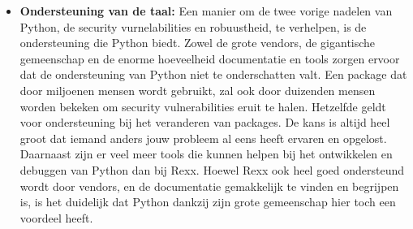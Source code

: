 \begin{itemize}
    \item \textbf{Ondersteuning van de taal:} Een manier om de twee vorige nadelen van Python, de security vurnelabilities en robuustheid, te verhelpen, is de ondersteuning die Python biedt. Zowel de grote vendors, de gigantische gemeenschap en de enorme hoeveelheid documentatie en tools zorgen ervoor dat de ondersteuning van Python niet te onderschatten valt. Een package dat door miljoenen mensen wordt gebruikt, zal ook door duizenden mensen worden bekeken om security vulnerabilities eruit te halen. Hetzelfde geldt voor ondersteuning bij het veranderen van packages. De kans is altijd heel groot dat iemand anders jouw probleem al eens heeft ervaren en opgelost. Daarnaast zijn er veel meer tools die kunnen helpen bij het ontwikkelen en debuggen van Python dan bij Rexx. Hoewel Rexx ook heel goed ondersteund wordt door vendors, en de documentatie gemakkelijk te vinden en begrijpen is, is het duidelijk dat Python dankzij zijn grote gemeenschap hier toch een voordeel heeft.
\end{itemize}

